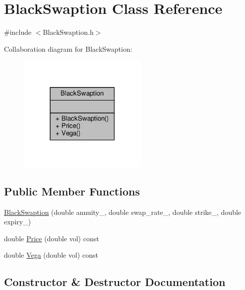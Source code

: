 \hypertarget{classBlackSwaption}{}\section{Black\+Swaption Class Reference}
\label{classBlackSwaption}


{\ttfamily \#include $<$Black\+Swaption.\+h$>$}



Collaboration diagram for Black\+Swaption\+:
\nopagebreak
\begin{figure}[H]
\begin{center}
\leavevmode
\includegraphics[width=177pt]{classBlackSwaption__coll__graph}
\end{center}
\end{figure}
\subsection*{Public Member Functions}
\begin{DoxyCompactItemize}
\item 
\hyperlink{classBlackSwaption_a5680b8b03c67b029749f43a907170258}{Black\+Swaption} (double annuity\+\_\+, double swap\+\_\+rate\+\_\+, double strike\+\_\+, double expiry\+\_\+)
\item 
double \hyperlink{classBlackSwaption_a87dea283a7e04dc04179e4b7014dd2e5}{Price} (double vol) const
\item 
double \hyperlink{classBlackSwaption_aa9f453250bb164887463ae41be3fca17}{Vega} (double vol) const
\end{DoxyCompactItemize}


\subsection{Constructor \& Destructor Documentation}
\hypertarget{classBlackSwaption_a5680b8b03c67b029749f43a907170258}{}\label{classBlackSwaption_a5680b8b03c67b029749f43a907170258} 
